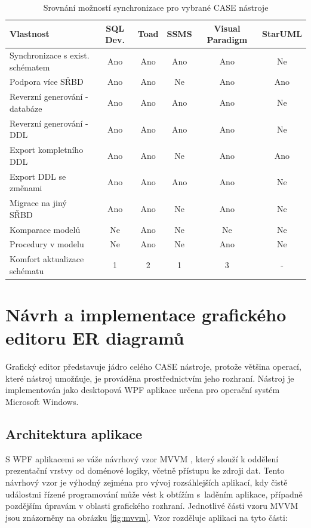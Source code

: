 \documentclass[czech,bachelor,public,dept460,male,oneside]{diploma}
\begin{document}
	\begin{table}[!h]
		\centering
		\caption{Srovnání možností synchronizace pro vybrané CASE nástroje}
		\label{tab:ddlCreateCmp}
		\begin{tabular}{l c c c c c}
			\toprule
			Vlastnost & SQL Dev. & Toad & SSMS & Visual Paradigm & StarUML \\
			\midrule
			Synchronizace s exist. schématem & Ano & Ano & Ano & Ano & Ne \\
			Podpora více SŘBD & Ano & Ano & Ne & Ano & Ano \\
			Reverzní generování - databáze & Ano & Ano & Ano & Ano & Ne \\
			Reverzní generování - DDL & Ano & Ano & Ano & Ano & Ne  \\
			Export kompletního DDL & Ano & Ano & Ne & Ano & Ano \\
			Export DDL se změnami & Ano & Ano & Ano & Ano & Ne \\
			Migrace na jiný SŘBD & Ano & Ano & Ne & Ano & Ne \\
			Komparace modelů & Ne & Ano & Ne & Ne & Ne \\
			Procedury v modelu & Ne & Ano & Ne & Ano & Ne \\
			Komfort aktualizace schématu & 1 & 2 & 1 & 3 & - \\
			\midrule
		\end{tabular}
	\end{table}
	
\newpage
\section{Návrh a implementace grafického editoru ER diagramů}
Grafický editor představuje jádro celého CASE nástroje, protože většina operací, které nástroj umožňuje, je prováděna prostřednictvím jeho rozhraní. Nástroj je implementován jako desktopová WPF aplikace \cite{wpf} určena pro operační systém Microsoft Windows. 
	
	\subsection{Architektura aplikace}
	S WPF aplikacemi se váže návrhový vzor MVVM \cite{mvvm}, který slouží k oddělení prezentační vrstvy od doménové logiky, včetně přístupu ke zdroji dat. Tento návrhový vzor je výhodný zejména pro vývoj rozsáhlejších aplikací, kdy čistě událostmi řízené programování může vést k obtížím s~laděním aplikace, případně pozdějším úpravám v oblasti grafického rozhraní. Jednotlivé části vzoru MVVM jsou znázorněny na obrázku \ref{fig:mvvm}. Vzor rozděluje aplikaci na tyto části: 
	
\end{document}
